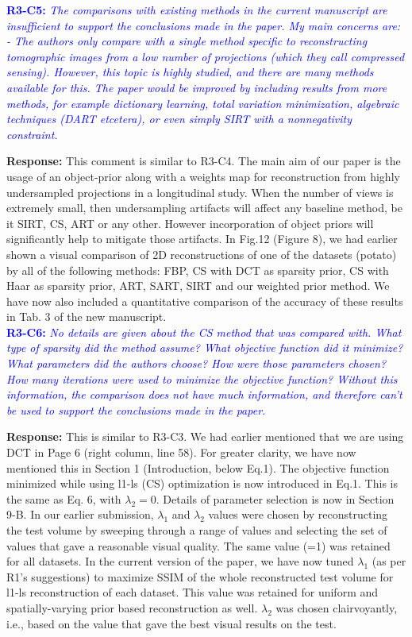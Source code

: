 \documentclass{article}
\begin{document}

\textcolor{blue}{\textbf{R3-C5:}\textit{ The comparisons with existing methods in the current manuscript are insufficient to support the conclusions made in the paper. My main concerns are: - The authors only compare with a single method specific to reconstructing tomographic images from a low number of projections (which they call compressed sensing). However, this topic is highly studied, and there are many methods available for this. The paper would be improved by including results from more methods, for example dictionary learning, total variation minimization, algebraic techniques (DART etcetera), or even simply SIRT with a nonnegativity constraint.}}

\textbf{Response:} This comment is similar to R3-C4. The main aim of our paper is the usage of an object-prior along with a weights map for reconstruction from highly undersampled projections in a longitudinal study. When the number of views is extremely small, then undersampling artifacts will affect any baseline method, be it SIRT, CS, ART or any other. However incorporation of object priors will significantly help to mitigate those artifacts.
In Fig.12 (Figure 8), we had earlier shown a visual comparison of 2D reconstructions of one of the datasets (potato) by all of the following methods: FBP, CS with DCT as sparsity prior, CS with Haar as sparsity prior, ART, SART, SIRT and our weighted prior method.
We have now also included a quantitative comparison of the accuracy of these results in Tab. 3 of the new manuscript.\\

\textcolor{blue}{\textbf{R3-C6:}\textit{ No details are given about the CS method that was compared with. What type of sparsity did the method assume? What objective function did it minimize? What parameters did the authors choose? How were those parameters chosen? How many iterations were used to minimize the objective function? Without this information, the comparison does not have much information, and therefore can't be used to support the conclusions made in the paper.}}

\textbf{Response:} This is similar to R3-C3. We had earlier mentioned that we are using DCT in Page 6 (right column, line 58). For greater clarity, we have now mentioned this in Section 1 (Introduction, below Eq.1).
The objective function minimized while using l1-ls (CS) optimization is now introduced in Eq.1. This is the same as Eq. 6,  with $\lambda_2 = 0$.
Details of parameter selection is now in Section 9-B.
In our earlier submission, $\lambda_1$ and $\lambda_2$ values were chosen by reconstructing the test volume by sweeping through a range of values and selecting the set of values that gave a reasonable visual quality. The same value (=1) was retained for all datasets. In the current version of the paper, we have now tuned $\lambda_1$ (as per R1's suggestions) to maximize SSIM of the whole reconstructed test volume for l1-ls reconstruction of each dataset. This value was retained for uniform and spatially-varying prior based reconstruction as well. $\lambda_2$ was chosen clairvoyantly,  i.e., based on the value that gave the best visual results on the test.\\
\end{document}
